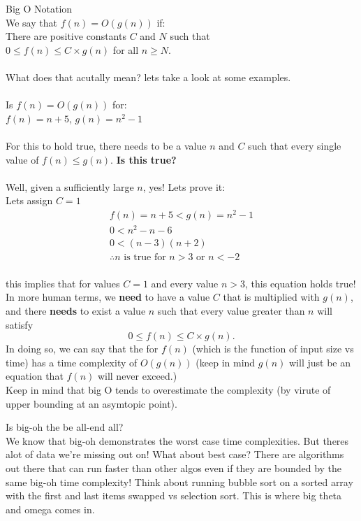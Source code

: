 \documentclass[journal, letterpaper]{IEEEtran}
\begin{document}
\begin{theory}{Big O Notation} \\
    We say that $f(n) = O(g(n))$ if: \\
        \indent There are positive constants $C$ and $N$ such that \\
        \indent $0 \leq{f(n)} \leq{C\times{g(n)}}$ for all $n \geq{N}$.\\
    \\
    What does that acutally mean? lets take a look at some examples.\\
    \\
    Is $f(n) = O(g(n))$ for: \\
    \indent$f(n) = n + 5$, $g(n) = n^2-1$\\
    \\
    For this to hold true, there needs to be a value $n$ and $C$ such that
    every single value of $f(n) \leq{g(n)}$. \textbf{Is this true?}\\
    \\
    Well, given a sufficiently large $n$, yes! Lets prove it:\\
    Lets assign $C = 1$\\
    \begin{gather}
    f(n) = n + 5 < g(n) = n^2 - 1\\
    0 < n^2 - n - 6\\
    0 < (n - 3)(n + 2)\\
    \therefore n \text{ is true for } n > 3 \text{ or } n < -2
    \end{gather}
    \\this implies that for values $C = 1$ and every value $n > 3$, this equation holds true!\\
    In more human terms, we \textbf{need} to have a value $C$ that is multiplied with $g(n)$, 
    and there \textbf{needs} to exist a value $n$ such that every value greater than $n$ will satisfy
    \[
        0 \leq f(n) \leq C \times g(n).
    \]
    In doing so, we can say that the for $f(n)$ (which is the function of input size vs time) has
    a time complexity of $O(g(n))$ (keep in mind $g(n)$ will just be an equation that $f(n)$ will never
    exceed.)\\

    Keep in mind that big O tends to overestimate the complexity (by virute of upper
    bounding at an asymtopic point).
\end{theory}

\begin{aside}{Is big-oh the be all-end all?}\\
    We know that big-oh demonstrates the worst case time complexities. But theres alot of
    data we're missing out on! What about best case? There are algorithms out there that
    can run faster than other algos even if they are bounded by the same big-oh time
    complexity! Think about running bubble sort on a sorted array with the first and last
    items swapped vs selection sort. This is where big theta and omega comes in.
\end{aside}
\end{document}
